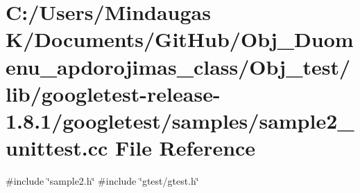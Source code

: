 \hypertarget{_obj__test_2lib_2googletest-release-1_88_81_2googletest_2samples_2sample2__unittest_8cc}{}\section{C\+:/\+Users/\+Mindaugas K/\+Documents/\+Git\+Hub/\+Obj\+\_\+\+Duomenu\+\_\+apdorojimas\+\_\+class/\+Obj\+\_\+test/lib/googletest-\/release-\/1.8.1/googletest/samples/sample2\+\_\+unittest.cc File Reference}
\label{_obj__test_2lib_2googletest-release-1_88_81_2googletest_2samples_2sample2__unittest_8cc}
{\ttfamily \#include \char`\"{}sample2.\+h\char`\"{}}\newline
{\ttfamily \#include \char`\"{}gtest/gtest.\+h\char`\"{}}\newline
